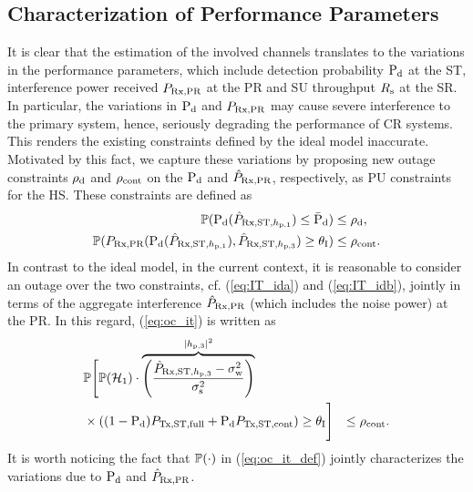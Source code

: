 \subsection{Characterization of Performance Parameters}
It is clear that the estimation of the involved channels translates to the variations in the performance parameters, which include detection probability $\text{P}_{\text{d}}$ at the ST, interference power received $P_{\text{Rx,PR}}$ at the PR and SU throughput $R_{\text{s}}$ at the SR. In particular, the variations in $\text{P}_{\text{d}}$ and $P_{\text{Rx,PR}}$ may cause severe interference to the primary system, hence, seriously degrading the performance of CR systems. This renders the existing constraints defined by the ideal model inaccurate. 
Motivated by this fact, we capture these variations by proposing new outage constraints $\rho_{\text{d}}$ and $\rho_{\text{cont}}$ on the $\text{P}_{\text{d}}$ and $\hat{P}_{\text{Rx,PR}}$, respectively, as PU constraints for the HS. These constraints are defined as  
\begin{align}
\p(\pd(\eprcvdstpt) \le \pdd) &\le \opdc \label{eq:oc_pd}, \\
\p(\prcvdpr(\pd(\eprcvdstpt), \eprcvdstpr) \ge \ite) &\le \opc \label{eq:oc_it}.
\end{align}   
In contrast to the ideal model, in the current context, it is reasonable to consider an outage over the two constraints, cf. (\ref{eq:IT_ida}) and (\ref{eq:IT_idb}), jointly in terms of the aggregate interference $\hat{P}_{\text{Rx,PR}}$ (which includes the noise power) at the PR. In this regard, (\ref{eq:oc_it}) is written as 
\begin{align}
& \p \Bigg[ \pho \cdot \smash[b]{\overbrace{\left( \frac{\eprcvdstpr - \npo}{\spo} \right)}^{\phpth}} \nonumber \\ & \times ((1 - \pd) \pfull + \pd \preg) \ge \ite \Bigg] &\le \opc \label{eq:oc_it_def}. 
\end{align}
It is worth noticing the fact that $\mathbb P(\cdot)$ in (\ref{eq:oc_it_def}) jointly characterizes the variations due to $\text{P}_{\text{d}}$ and $\hat{P}_{\text{Rx,PR}}$. 

